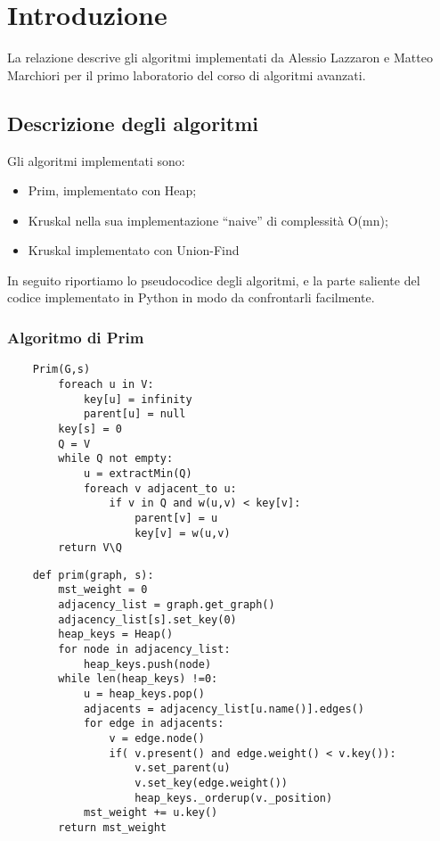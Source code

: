 \chapter{Introduzione\label{sec:introduzione}}
\noindent La relazione descrive gli algoritmi implementati da Alessio Lazzaron e Matteo Marchiori per il primo laboratorio del corso di algoritmi avanzati.

\section{Descrizione degli algoritmi\label{sec:descrizione}}
Gli algoritmi implementati sono:
\begin{itemize}
    \item Prim, implementato con Heap;
    \item Kruskal nella sua implementazione ``naive'' di complessità O(mn);
    \item Kruskal implementato con Union-Find
\end{itemize}

In seguito riportiamo lo pseudocodice degli algoritmi, e la parte saliente del codice implementato in Python in modo da confrontarli facilmente.

\clearpage

\subsection{Algoritmo di Prim\label{sec:prim}}
\begin{verbatim}
    Prim(G,s)
        foreach u in V:
            key[u] = infinity
            parent[u] = null
        key[s] = 0
        Q = V
        while Q not empty:
            u = extractMin(Q)
            foreach v adjacent_to u:
                if v in Q and w(u,v) < key[v]:
                    parent[v] = u
                    key[v] = w(u,v)
        return V\Q
\end{verbatim}

\begin{verbatim}
    def prim(graph, s):
        mst_weight = 0
        adjacency_list = graph.get_graph()
        adjacency_list[s].set_key(0)
        heap_keys = Heap()
        for node in adjacency_list:
            heap_keys.push(node)
        while len(heap_keys) !=0:
            u = heap_keys.pop()
            adjacents = adjacency_list[u.name()].edges()
            for edge in adjacents:
                v = edge.node()
                if( v.present() and edge.weight() < v.key()):
                    v.set_parent(u)
                    v.set_key(edge.weight())
                    heap_keys._orderup(v._position)
            mst_weight += u.key()
        return mst_weight
\end{verbatim}

